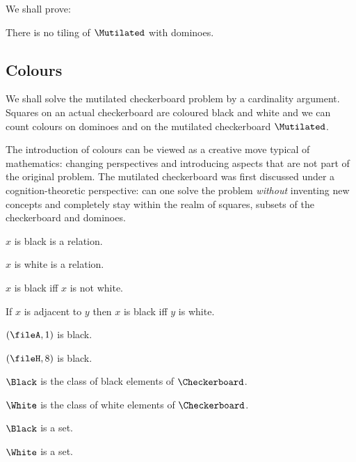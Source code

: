 We shall prove:

\begin{theorem}
    There is no tiling of $\Mutilated$ with dominoes.
\end{theorem}



\subsection{Colours}

We shall solve the mutilated checkerboard problem by a cardinality argument.
Squares on an actual checkerboard are coloured black and white and we can count
colours on dominoes and on the mutilated checkerboard $\Mutilated$.

The introduction of colours can be viewed as a creative move typical of
mathematics: changing perspectives and introducing aspects that are not part
of the original problem. The mutilated checkerboard was first discussed under
a cognition-theoretic perspective: can one solve the problem {\emph{without}}
inventing new concepts and completely stay within the realm of squares,
subsets of the checkerboard and dominoes.


\begin{forthel}
    \begin{signature} $x$ is black is a relation. \end{signature}
    \begin{signature} $x$ is white is a relation. \end{signature}

    \begin{axiom} $x$ is black iff $x$ is not white. \end{axiom}
    \begin{axiom} If $x$ is adjacent to $y$ then $x$ is black iff $y$ is white. \end{axiom}

    \begin{axiom} $(\fileA,1)$ is black. \end{axiom}
    \begin{axiom} $(\fileH,8)$ is black. \end{axiom}

    \begin{definition} $\Black$ is the class of black elements of $\Checkerboard$. \end{definition}
    \begin{definition} $\White$ is the class of white elements of $\Checkerboard$. \end{definition}

    \begin{lemma} $\Black$ is a set. \end{lemma}
    \begin{lemma} $\White$ is a set. \end{lemma}
\end{forthel}


